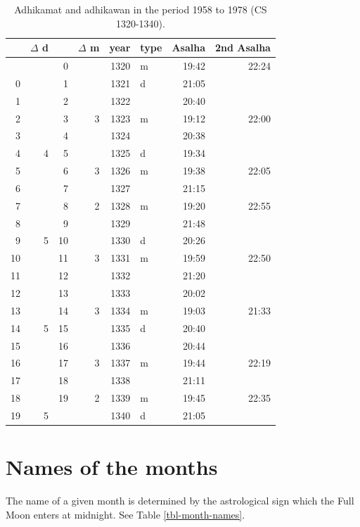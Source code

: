\documentclass[11pt,oneside]{memoir-article}
\begin{document}
\begin{table}[p]
\caption{Adhikamat and adhikawan in the period 1958 to 1978 (CS 1320-1340).\cite{eade-interpolation}}
\centering
\begin{tabular}{rrrrrlrr}
 & $\Delta$ d &  & $\Delta$ m & year & type & Asalha & 2nd Asalha\\
\hline
 &  & 0 &  & 1320 & m & 19:42 & 22:24\\
0 &  & 1 &  & 1321 & d & 21:05 & \\
1 &  & 2 &  & 1322 &  & 20:40 & \\
2 &  & 3 & 3 & 1323 & m & 19:12 & 22:00\\
3 &  & 4 &  & 1324 &  & 20:38 & \\
4 & 4 & 5 &  & 1325 & d & 19:34 & \\
5 &  & 6 & 3 & 1326 & m & 19:38 & 22:05\\
6 &  & 7 &  & 1327 &  & 21:15 & \\
7 &  & 8 & 2 & 1328 & m & 19:20 & 22:55\\
8 &  & 9 &  & 1329 &  & 21:48 & \\
9 & 5 & 10 &  & 1330 & d & 20:26 & \\
10 &  & 11 & 3 & 1331 & m & 19:59 & 22:50\\
11 &  & 12 &  & 1332 &  & 21:20 & \\
12 &  & 13 &  & 1333 &  & 20:02 & \\
13 &  & 14 & 3 & 1334 & m & 19:03 & 21:33\\
14 & 5 & 15 &  & 1335 & d & 20:40 & \\
15 &  & 16 &  & 1336 &  & 20:44 & \\
16 &  & 17 & 3 & 1337 & m & 19:44 & 22:19\\
17 &  & 18 &  & 1338 &  & 21:11 & \\
18 &  & 19 & 2 & 1339 & m & 19:45 & 22:35\\
19 & 5 &  &  & 1340 & d & 21:05 & \\
\end{tabular}
\end{table}

\clearpage
\section{Names of the months}
\label{sec-3-5}

The name of a given month is determined by the astrological sign which
the Full Moon enters at midnight. See Table \ref{tbl-month-names}.
\end{document}
